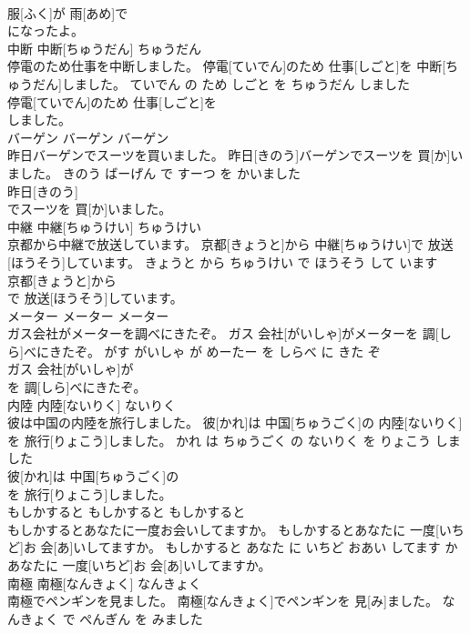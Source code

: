\documentclass[8pt]{extreport}
\begin{document}
\begin{CJK}{UTF8}{min}
\\	服[ふく]が 雨[あめ]で
\\	になったよ。			
\\	中断	中断[ちゅうだん]	ちゅうだん	
\\	停電のため仕事を中断しました。	停電[ていでん]のため 仕事[しごと]を 中断[ちゅうだん]しました。	ていでん の ため しごと を ちゅうだん しました	
\\	停電[ていでん]のため 仕事[しごと]を
\\	しました。			
\\	バーゲン	バーゲン	バーゲン	
\\	昨日バーゲンでスーツを買いました。	昨日[きのう]バーゲンでスーツを 買[か]いました。	きのう ばーげん で すーつ を かいました	
\\	昨日[きのう]
\\	でスーツを 買[か]いました。			
\\	中継	中継[ちゅうけい]	ちゅうけい	
\\	京都から中継で放送しています。	京都[きょうと]から 中継[ちゅうけい]で 放送[ほうそう]しています。	きょうと から ちゅうけい で ほうそう して います	
\\	京都[きょうと]から
\\	で 放送[ほうそう]しています。			
\\	メーター	メーター	メーター	
\\	ガス会社がメーターを調べにきたぞ。	ガス 会社[がいしゃ]がメーターを 調[しら]べにきたぞ。	がす がいしゃ が めーたー を しらべ に きた ぞ	
\\	ガス 会社[がいしゃ]が
\\	を 調[しら]べにきたぞ。			
\\	内陸	内陸[ないりく]	ないりく	
\\	彼は中国の内陸を旅行しました。	彼[かれ]は 中国[ちゅうごく]の 内陸[ないりく]を 旅行[りょこう]しました。	かれ は ちゅうごく の ないりく を りょこう しました	
\\	彼[かれ]は 中国[ちゅうごく]の
\\	を 旅行[りょこう]しました。			
\\	もしかすると	もしかすると	もしかすると	
\\	もしかするとあなたに一度お会いしてますか。	もしかするとあなたに 一度[いちど]お 会[あ]いしてますか。	もしかすると あなた に いちど おあい してます か	
\\	あなたに 一度[いちど]お 会[あ]いしてますか。			
\\	南極	南極[なんきょく]	なんきょく	
\\	南極でペンギンを見ました。	南極[なんきょく]でペンギンを 見[み]ました。	なんきょく で ぺんぎん を みました	

\end{CJK}
\end{document}
